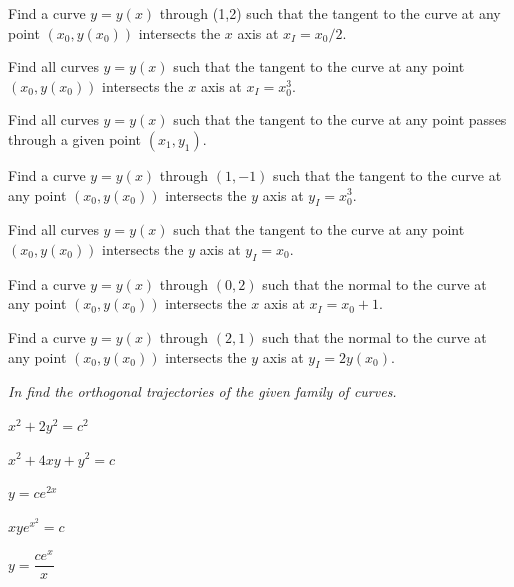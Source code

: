 \begin{exerciselist}
\item\label{exer:4.5.18}Find a curve $y=y(x)$ through (1,2) such that the tangent to the curve
at any point $(x_0,y(x_0))$ intersects the $x$ axis at
$x_I=x_0/2$.

\item\label{exer:4.5.19}Find all curves $y=y(x)$ such that the tangent to the curve at any
point $(x_0,y(x_0))$ intersects the $x$ axis at $x_I=x^3_0$.

\item\label{exer:4.5.20}Find all curves $y=y(x)$ such that the tangent to the curve at any
point passes through a given point $(x_1,y_1)$.

\item\label{exer:4.5.21}Find a curve $y=y(x)$ through $(1,-1)$ such that the tangent to the
curve at any point $(x_0,y(x_0))$ intersects the $y$ axis at
$y_I=x^3_0$.

\item\label{exer:4.5.22}Find all curves $y=y(x)$ such that the tangent to the curve at any
point $(x_0,y(x_0))$ intersects the $y$ axis at $y_I=x_0$.

\item\label{exer:4.5.23}Find a curve $y=y(x)$ through $(0,2)$ such that the normal to the
curve at any point $(x_0,y(x_0))$ intersects the $x$ axis at
$x_I=x_0+1$.

\item\label{exer:4.5.24}Find a curve $y=y(x)$ through $(2,1)$ such that the normal to the
curve at any point $(x_0,y(x_0))$ intersects the $y$ axis at
$y_I=2y(x_0)$.
\end{exerciselist}
%
\textsl{In  find the
orthogonal trajectories of the given family of curves.}

\begin{exerciselistTwoColumn}
\item\label{exer:4.5.25}$x^2+2y^2=c^2$
\item\label{exer:4.5.26}$x^2+4xy+y^2=c$
\item\label{exer:4.5.27}$y=ce^{2x}$
\item\label{exer:4.5.28}$xye^{x^2}=c$
\item\label{exer:4.5.29}$y=\dfrac{ce^x}{x}$
\end{exerciselistTwoColumn}

